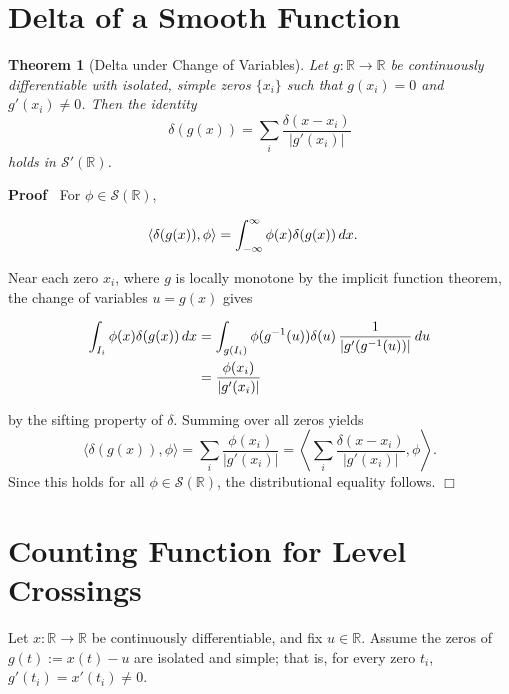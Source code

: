 \documentclass{article}
\newcommand{\assign}{:=}
\newenvironment{proof}{\noindent\textbf{Proof\ }}{\hspace*{\fill}$\Box$\medskip}
\newtheorem{theorem}{Theorem}
\begin{document}
\section{Delta of a Smooth Function}

\begin{theorem}
  [Delta under Change of Variables] Let $g : \mathbb{R} \to \mathbb{R}$ be
  continuously differentiable with isolated, simple zeros $\{x_i \}$ such that
  $g (x_i) = 0$ and $g' (x_i) \neq 0$. Then the identity
  \[ \delta (g (x)) = \sum_i \frac{\delta (x - x_i)}{|g' (x_i) |} \]
  holds in $\mathcal{S}' (\mathbb{R})$.
\end{theorem}

\begin{proof}
  For $\phi \in \mathcal{S} (\mathbb{R})$,
  
  \begin{align*}
    \langle \delta (g (x)), \phi \rangle & = \int_{- \infty}^{\infty} \phi (x)
    \delta (g (x))  \hspace{0.17em} dx.
  \end{align*}
  
  Near each zero $x_i$, where $g$ is locally monotone by the implicit function
  theorem, the change of variables $u = g (x)$ gives
  
  \begin{align*}
    \int_{I_i} \phi (x) \delta (g (x))  \hspace{0.17em} dx & = \int_{g (I_i)}
    \phi (g^{- 1} (u)) \delta (u) \hspace{0.17em} \frac{1}{|g' (g^{- 1} (u))
    |}  \hspace{0.17em} du\\
    & = \frac{\phi (x_i)}{|g' (x_i) |}
  \end{align*}
  
  by the sifting property of $\delta$. Summing over all zeros yields
  \[ \langle \delta (g (x)), \phi \rangle = \sum_i \frac{\phi (x_i)}{|g' (x_i)
     |} = \left\langle \sum_i \frac{\delta (x - x_i)}{|g' (x_i) |}, \phi
     \right\rangle . \]
  Since this holds for all $\phi \in \mathcal{S} (\mathbb{R})$, the
  distributional equality follows.
\end{proof}

\section{Counting Function for Level Crossings}

Let $x : \mathbb{R} \to \mathbb{R}$ be continuously differentiable, and fix $u
\in \mathbb{R}$. Assume the zeros of $g (t) \assign x (t) - u$ are isolated
and simple; that is, for every zero $t_i$, $g' (t_i) = x' (t_i) \neq 0$.
\end{document}
